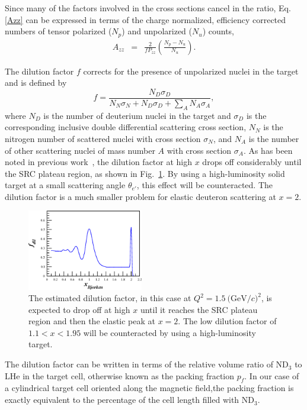 Since many of the factors involved in the cross sections cancel in
the ratio, Eq. \ref{Azz} can be expressed in terms 
of the charge normalized, efficiency corrected numbers of tensor polarized ($N_p$) and unpolarized ($N_u$) counts, 
\begin{eqnarray} \label{3}
A_{zz}&=&\frac{2}{fP_{zz}}\left(\frac{N_p - N_u}{N_u}\right) .
\end{eqnarray}

The dilution factor $f$ corrects for the presence of unpolarized nuclei in the target and is defined by
\begin{equation}
f=\frac{N_D\sigma_D}{N_N\sigma_N+N_D\sigma_D+\sum\limits_{A} N_A\sigma_A},
\end{equation}
where $N_D$ is the number of deuterium nuclei in the target and $\sigma_D$ is the corresponding inclusive double differential scattering cross 
section, $N_N$ is the nitrogen number of scattered nuclei with cross section $\sigma_N$, and $N_A$ is the number of other scattering nuclei of mass number $A$ with cross section $\sigma_A$. As has been noted in previous work~\cite{Frankfurt:1988nt}, the dilution factor at high $x$ drops off considerably until the SRC plateau region, as shown in Fig.~\ref{fdil}. By using a high-luminosity solid target at a small scattering angle $\theta_{e'}$, this effect will be counteracted. The dilution factor is a much smaller problem for elastic deuteron scattering at $x=2$.

\begin{figure}
\begin{center}
\includegraphics[width=0.45\textwidth]{figs/fdil_q2_15.eps}
\caption{\label{fdil}The estimated dilution factor, in this case at $Q^2=1.5 \mathrm{~(GeV}/c)^2$, is expected to drop off at high $x$ until it reaches the SRC plateau region and then the elastic peak at $x=2$. The low dilution factor of $1.1<x<1.95$ will be counteracted by using a high-luminosity target.}
\end{center}
\end{figure}

The dilution factor can be written in terms of the relative volume ratio of ND$_3$ to LHe in the target cell, otherwise known as the packing fraction $p_f$.  
In our case of a cylindrical target cell oriented along the magnetic field,the packing fraction is exactly equivalent to the percentage of the cell length filled with ND$_3$.  

